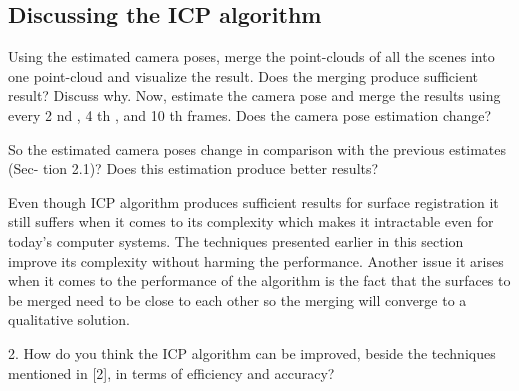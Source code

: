 \subsection{Discussing the ICP algorithm}
Using the estimated camera poses, merge the point-clouds of all the scenes into one point-cloud and visualize the result. Does the merging produce sufficient result? Discuss why. Now, estimate the camera pose and merge the results using every 2 nd , 4 th , and 10 th frames. Does the camera pose estimation change?

So the estimated camera poses change in comparison with the previous estimates (Sec- tion 2.1)? Does this estimation produce better results?

Even though ICP algorithm produces sufficient results for surface registration it still suffers when it comes to its complexity which makes it intractable even for today's computer systems. The techniques presented earlier in this section improve its complexity without harming the performance. Another issue it arises when it comes to the performance of the algorithm is the fact that the surfaces to be merged need to be close to each other so the merging will converge to a qualitative solution.

2. How do you think the ICP algorithm can be improved, beside the techniques mentioned in [2], in terms of efficiency and accuracy?


